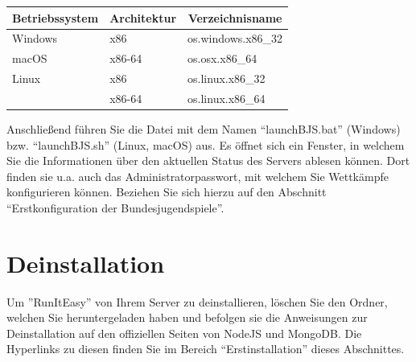 \documentclass[11pt,a4paper,titlepage,german]{article}
\begin{document}
			\begin{center}
				\def\arraystretch{2}
				\begin{tabular}{ l | l | l }
					\multicolumn{1}{c}{\bfseries Betriebssystem} & \multicolumn{1}{c}{\bfseries Architektur} & \multicolumn{1}{c}{\bfseries Verzeichnisname} \\
					\hline
					Windows & x86 & os.windows.x86\_32 \\
					\hline
					macOS & x86-64 & os.osx.x86\_64 \\
					\hline
					Linux & x86 & os.linux.x86\_32 \\
					 & x86-64 & os.linux.x86\_64
				\end{tabular}
			\end{center}
			
			Anschließend führen Sie die Datei mit dem Namen “launchBJS.bat” (Windows) bzw. “launchBJS.sh” (Linux, macOS) aus. Es öffnet sich ein Fenster, in welchem Sie die Informationen über den aktuellen Status des Servers ablesen können. Dort finden sie u.a. auch das Administratorpasswort, mit welchem Sie Wettkämpfe konfigurieren können. Beziehen Sie sich hierzu auf den Abschnitt “Erstkonfiguration der Bundesjugendspiele”.
			
		\section{Deinstallation}
			Um ''RunItEasy'' von Ihrem Server zu deinstallieren, löschen Sie den Ordner, welchen Sie heruntergeladen haben und befolgen sie die Anweisungen zur Deinstallation auf den offiziellen Seiten von NodeJS und MongoDB. Die Hyperlinks zu diesen finden Sie im Bereich “Erstinstallation” dieses Abschnittes.
		
	\newpage
		
\end{document}
